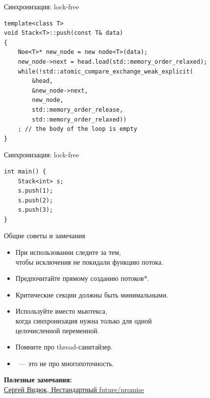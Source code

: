 \documentclass{beamer}
\begin{document}
\begin{frame}[fragile]{Синхронизация: lock-free}
    \begin{lstlisting}
template<class T>
void Stack<T>::push(const T& data)
{
    Noe<T>* new_node = new node<T>(data);
    new_node->next = head.load(std::memory_order_relaxed);
    while(!std::atomic_compare_exchange_weak_explicit(
        &head,
        &new_node->next,
        new_node,
        std::memory_order_release,
        std::memory_order_relaxed))
    ; // the body of the loop is empty
}
    \end{lstlisting}
\end{frame}

\begin{frame}[fragile]{Синхронизация: lock-free}
    \begin{lstlisting}
int main() {
    Stack<int> s;
    s.push(1);
    s.push(2);
    s.push(3);
}
    \end{lstlisting}
\end{frame}

\begin{frame}{Общие советы и замечания}
    \begin{itemize}
        \item При использовании  следите за тем,\\ чтобы исключения не покидали функцию потока.
        \item Предпочитайте  прямому созданию потоков*.
        \item Критические секции должны быть минимальными.
        \item Используйте  вместо мьютекса,\\
            когда синхронизация нужна только для одной\\ целочисленной
            переменной.
        \item Помните про thread-санитайзер.
        \item {}~--- это не про многопоточность.
    \end{itemize}
    {\bf*Полезные замечания:}\\
        \href{https://youtu.be/dig9jrcCmLU}{Сергей Видюк, Нестандартный future/promise}
\end{frame}
\end{document}
